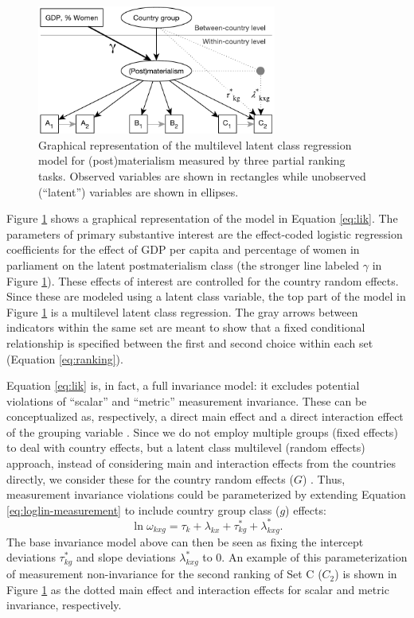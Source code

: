 \documentclass[letterpaper,12pt]{article}
\begin{document}
\begin{figure}\centering
	\includegraphics[width=0.7\textwidth]{figures/model}
	\caption{\label{fig:model}Graphical representation of 
	the multilevel latent class regression model for 
	(post)materialism measured by three partial ranking tasks. Observed variables are shown in rectangles while unobserved (``latent'') variables are shown in ellipses.	}
\end{figure}


Figure \ref{fig:model} shows a graphical representation of the model in Equation \ref{eq:lik}. 
The parameters of primary substantive interest are the effect-coded logistic regression coefficients for the effect of GDP per capita and percentage of women in parliament on the latent postmaterialism class (the stronger line labeled $\gamma$ in Figure \ref{fig:model}). 
These effects of interest are controlled for the country random effects. Since these are modeled using a latent class variable, the top part of the model in Figure \ref{fig:model} is a multilevel latent class regression. The gray arrows between indicators within the same set are meant to show that a fixed conditional relationship is specified between the first and second choice within each set (Equation \ref{eq:ranking}). 

Equation \ref{eq:lik} is, in fact, a full invariance model: it excludes potential violations of ``scalar''  and ``metric'' measurement invariance. These can be conceptualized as, respectively, a direct main effect and a direct interaction effect of the grouping variable 
\citep{mellenbergh1989item,kankaras2010testing,kankaras2011measurement}. Since we do not employ multiple groups (fixed effects) to deal with country effects, but a latent class multilevel (random effects) approach, instead of considering main and interaction effects from the countries directly, we consider these for the country random effects ($G$)  \citep[see][]{dejong2007relaxing,fox2011random}.
Thus, measurement invariance violations could be parameterized by extending Equation  \ref{eq:loglin-measurement} to include country group class ($g$) effects:
\begin{equation}
	\ln \omega_{k x g} = \tau_{k} + \lambda_{k x} + 
		\tau^{*}_{k g} + \lambda^{*}_{k x g}.
			\label{eq:loglin-measurement-noninvariant}
\end{equation}
The base invariance model above can then be seen as fixing the intercept deviations $\tau^{*}_{k g}$  and slope deviations $\lambda^{*}_{k x g}$ to 0.  An example of this parameterization of measurement non-invariance for 
the second ranking of Set C ($C_2$) is shown in Figure \ref{fig:model} as the dotted main effect and interaction effects for scalar and metric invariance, respectively. 
\end{document}
